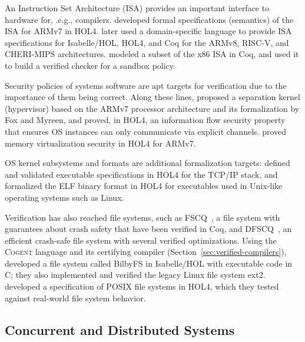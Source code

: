 An Instruction Set Architecture (ISA) provides an important interface to hardware for, .e.g., compilers.
\cite{Fox2010} developed formal specifications (semantics) of the ISA for ARMv7 in HOL4. \cite{Armstrong2019} later used a domain-specific language to provide ISA specifications for Isabelle/HOL, HOL4, and Coq for the ARMv8, RISC-V, and CHERI-MIPS architectures.
\cite{Morrisett2012} modeled a subset of the x86 ISA in Coq, and used it to build a verified checker for a sandbox policy.

Security policies of systems software are apt targets for verification due to the importance of them being correct.
Along these lines, \cite{Dam2013} proposed a separation kernel (hypervisor) based on the ARMv7 processor architecture and its formalization by Fox and Myreen, and proved, in HOL4, an information flow security property that ensures OS instances can only communicate via explicit channels. \cite{Guanciale2016} proved memory virtualization security in HOL4 for ARMv7.

OS kernel subsystems and formats are additional formalization targets: \cite{Bishop2006,Bishop2018} defined and validated executable specifications in HOL4 for the TCP/IP stack, and \cite{Kell2016} formalized the ELF binary format in HOL4 for executables used in Unix-like operating systems such as Linux.

Verification has also reached file systems, such as FSCQ~\citep{Chen2015}, a file system with guarantees about crash safety that have been verified in Coq,
and DFSCQ~\citep{Chajed2017}, an efficient crash-safe file system with several verified optimizations.
Using the \textsc{Cogent} language and its certifying compiler (Section~\ref{sec:verified-compilers}),
\cite{Amani16} developed a file system called BilbyFS in Isabelle/HOL with executable code in C; they also implemented and verified the legacy Linux file system ext2. \cite{Ridge2015} developed a specification of POSIX file systems in HOL4, which they tested against real-world file system behavior.

\subsection{Concurrent and Distributed Systems}
\label{sec:distributed-systems}

